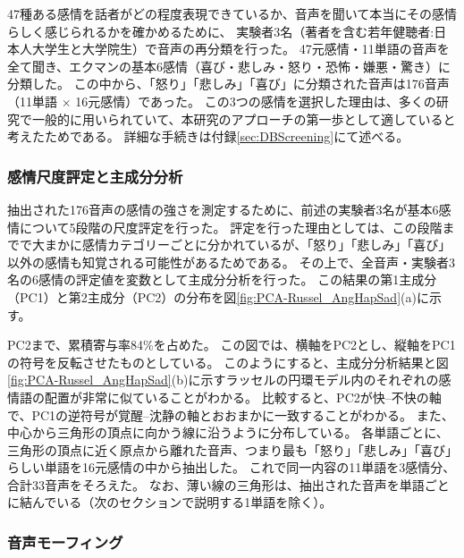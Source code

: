 47種ある感情を話者がどの程度表現できているか、音声を聞いて本当にその感情らしく感じられるかを確かめるために、
実験者3名（著者を含む若年健聴者:日本人大学生と大学院生）で音声の再分類を行った。
47元感情・11単語の音声を全て聞き、エクマンの基本6感情（喜び・悲しみ・怒り・恐怖・嫌悪・驚き）\cite{ekman1992argument}に分類した。
この中から、「怒り」「悲しみ」「喜び」に分類された音声は176音声（11単語 $\times$ 16元感情）であった。
この3つの感情を選択した理由は、多くの研究で一般的に用いられていて、本研究のアプローチの第一歩として適していると考えたためである。
詳細な手続きは付録\ref{sec:DBScreening}にて述べる。

\newpage


\subsubsection{感情尺度評定と主成分分析}
抽出された176音声の感情の強さを測定するために、前述の実験者3名が基本6感情について5段階の尺度評定を行った。
評定を行った理由としては、この段階までで大まかに感情カテゴリーごとに分かれているが、「怒り」「悲しみ」「喜び」以外の感情も知覚される可能性があるためである。
その上で、全音声・実験者3名の6感情の評定値を変数として主成分分析を行った。
この結果の第1主成分（PC1）と第2主成分（PC2）の分布を図\ref{fig:PCA-Russel_AngHapSad}(a)に示す。

PC2まで、累積寄与率84\%を占めた。
この図では、横軸をPC2とし、縦軸をPC1の符号を反転させたものとしている。
このようにすると、主成分分析結果と図\ref{fig:PCA-Russel_AngHapSad}(b)に示すラッセルの円環モデル\cite{russell1980circumplex}内のそれぞれの感情語の配置が非常に似ていることがわかる。
比較すると、PC2が快--不快の軸で、PC1の逆符号が覚醒--沈静の軸とおおまかに一致することがわかる。
また、中心から三角形の頂点に向かう線に沿うように分布している。
各単語ごとに、三角形の頂点に近く原点から離れた音声、つまり最も「怒り」「悲しみ」「喜び」らしい単語を16元感情の中から抽出した。
これで同一内容の11単語を3感情分、合計33音声をそろえた。
なお、薄い線の三角形は、抽出された音声を単語ごとに結んでいる（次のセクションで説明する1単語を除く）。





\subsubsection{音声モーフィング}
\label{sec:morphAngSadHap}

